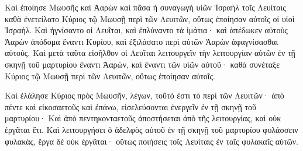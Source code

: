{\par }{\PP {}Καὶ ἐποίησε Μωυσῆς καὶ Ἀαρὼν καὶ πᾶσα ἡ συναγωγὴ υἱῶν Ἰσραὴλ τοῖς Λευίταις καθὰ ἐνετείλατο Κύριος τῷ Μωυσῇ περὶ τῶν Λευιτῶν, οὕτως ἐποίησαν αὐτοῖς οἱ υἱοὶ Ἰσραήλ.
Καὶ ἡγνίσαντο οἱ Λευῖται, καὶ ἐπλύναντο τὰ ἱμάτια· καὶ ἀπέδωκεν αὐτοὺς Ἀαρὼν ἀπόδομα ἔναντι Κυρίου, καὶ ἐξιλάσατο περὶ αὐτῶν Ἀαρὼν ἀφαγνίσασθαι αὐτούς.
Καὶ μετὰ ταῦτα εἰσῆλθον οἱ Λευῖται λειτουργεῖν τὴν λειτουργίαν αὐτῶν ἐν τῇ σκηνῇ τοῦ μαρτυρίου ἔναντι Ἀαρὼν, καὶ ἔναντι τῶν υἱῶν αὐτοῦ· καθὰ συνέταξε Κύριος τῷ Μωυσῇ περὶ τῶν Λευιτῶν, οὕτως ἐποίησαν αὐτοῖς.
\par }{\PP {}Καὶ ἐλάλησε Κύριος πρὸς Μωυσῆν, λέγων,
τοῦτό ἐστι τὸ περὶ τῶν Λευιτῶν· ἀπὸ πέντε καὶ εἰκοσαετοῦς καὶ ἐπάνω, εἰσελεύσονται ἐνεργεῖν ἐν τῇ σκηνῇ τοῦ μαρτυρίου·
Καὶ ἀπὸ πεντηκονταετοῦς ἀποστήσεται ἀπὸ τῆς λειτουργίας, καὶ οὐκ ἐργᾶται ἔτι.
Καὶ λειτουργήσει ὁ ἀδελφὸς αὑτοῦ ἐν τῇ σκηνῇ τοῦ μαρτυρίου φυλάσσειν φυλακὰς, ἔργα δὲ οὐκ ἐργᾶται· οὕτως ποιήσεις τοῖς Λευίταις ἐν ταῖς φυλακαῖς αὐτῶν.

}
